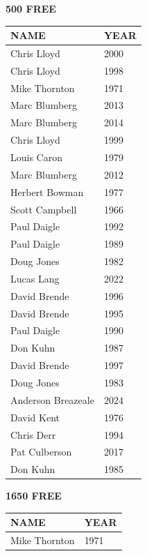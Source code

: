 \begin{table}[H]
\centering
\begin{minipage}[t]{0.48\textwidth}
\centering
\textbf{500 FREE}\\[0.1cm]
\begin{tabular}{@{}p{2.8cm}p{1.2cm}@{}}
\hline
    \textbf{NAME} & \textbf{YEAR} \\
\hline
    Chris Lloyd & 2000 \\
    Chris Lloyd & 1998 \\
    Mike Thornton & 1971 \\
    Marc Blumberg & 2013 \\
    Marc Blumberg & 2014 \\
    Chris Lloyd & 1999 \\
    Louis Caron & 1979 \\
    Marc Blumberg & 2012 \\
    Herbert Bowman & 1977 \\
    Scott Campbell & 1966 \\
    Paul Daigle & 1992 \\
    Paul Daigle & 1989 \\
    Doug Jones & 1982 \\
    Lucas Lang & 2022 \\
    David Brende & 1996 \\
    David Brende & 1995 \\
    Paul Daigle & 1990 \\
    Don Kuhn & 1987 \\
    David Brende & 1997 \\
    Doug Jones & 1983 \\
    Anderson Breazeale & 2024 \\
    David Kent & 1976 \\
    Chris Derr & 1994 \\
    Pat Culberson & 2017 \\
    Don Kuhn & 1985 \\
\hline
\end{tabular}
\end{minipage}\hfill
\begin{minipage}[t]{0.48\textwidth}
\centering
\textbf{1650 FREE}\\[0.1cm]
\begin{tabular}{@{}p{2.8cm}p{1.2cm}@{}}
\hline
    \textbf{NAME} & \textbf{YEAR} \\
\hline
    Mike Thornton & 1971 \\

\end{tabular}
\end{minipage}
\end{table}
